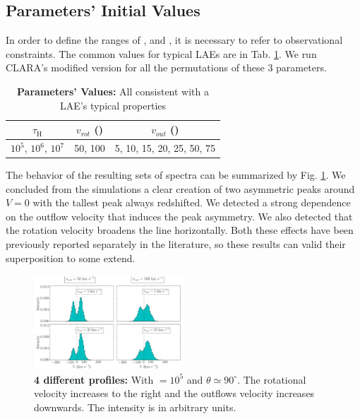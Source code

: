 \documentclass[twocolappendix]{latex/emulateapj}
\begin{document}
\subsection{Parameters' Initial Values}
In order to define the ranges of \tauh, \vrot and \vout, it is necessary to refer to observational constraints. The common values for typical LAEs are in Tab. \ref{tab:values}. We run CLARA's modified version for all the permutations of these 3 parameters. \\

\begin{table}[htbp]
	\centering
	\begin{tabular}{|c|c|c|}
		\hline
		$\tau_{\mathrm{H}}$ & $v_{rot}$ (\kms) & $v_{out}$ (\kms) \\
		\hline
		$10^5$, $10^6$, $10^7$ & 50, 100 & 5, 10, 15, 20, 25, 50, 75 \\
		\hline
	\end{tabular}
	\caption{\textbf{Parameters' Values:} All consistent with a LAE's typical properties}
	\label{tab:values}
\end{table}

The behavior of the resulting sets of spectra can be summarized by Fig. \ref{fig:summary}. We concluded from the simulations a clear creation of two asymmetric peaks around $V=0$ \kms with the tallest peak always redshifted. We detected a strong dependence on the outflow velocity that induces the peak asymmetry. We also detected that the rotation velocity broadens the line horizontally. Both these effects have been previously reported separately in the literature, so these results can valid their superposition to some extend. \\

\begin{figure}[h!]
	\begin{center}
		\includegraphics[width=0.5\textwidth]{./figures/summary}
	\end{center}
	\caption{\textbf{4 different \lya profiles:} With \tauh$=10^5$ and $\theta \simeq 90^\circ$. The rotational velocity \vrot increases to the right and the outflows velocity \vout increases downwards. The intensity is in arbitrary units.
		\label{fig:summary}}
\end{figure}
\end{document}
